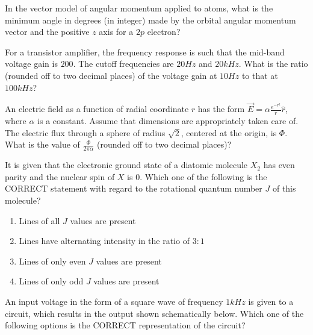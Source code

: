 \item In the vector model of angular momentum applied to atoms, what is the minimum angle in degrees (in integer) made by the orbital angular momentum vector and the positive $z$ axis for a $2p$ electron?

\item For a transistor amplifier, the frequency response is such that the mid-band voltage gain is $200$. The cutoff frequencies are $20 Hz$ and $20 kHz$. What is the ratio (rounded off to two decimal places) of the voltage gain at $10 Hz$ to that at $100 kHz$?

\item An electric field as a function of radial coordinate $r$ has the form $\overrightarrow{E} = \alpha \frac{e^{-r^{2}}}{r} \hat{r}$, where $\alpha$ is a constant. Assume that dimensions are appropriately taken care of. The electric flux through a sphere of radius $\sqrt{2}$, centered at the origin, is $\Phi$. What is the value of $\frac{\Phi}{2\pi \alpha}$ (rounded off to two decimal places)?

\item It is given that the electronic ground state of a diatomic molecule $X_2$ has even parity and the nuclear spin of $X$ is $0$. Which one of the following is the CORRECT statement with regard to the rotational quantum number $J$ of this molecule?

\begin{enumerate}
    \item Lines of all $J$ values are present
    \item Lines have alternating intensity in the ratio of $3:1$
    \item Lines of only even $J$ values are present
    \item Lines of only odd $J$ values are present
\end{enumerate}


\item An input voltage in the form of a square wave of frequency $1 kHz$ is given to a circuit, which results in the output shown schematically below. Which one of the following options is the CORRECT representation of the circuit?


\centering
{}

